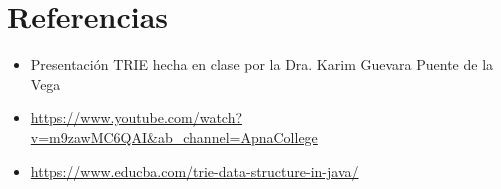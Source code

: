 \documentclass{article}
\begin{document}
\section{Referencias}
\begin{itemize}			
	\item Presentación TRIE hecha en clase por la Dra. Karim Guevara Puente de la Vega
	\item \url{https://www.youtube.com/watch?v=m9zawMC6QAI&ab_channel=ApnaCollege}
	\item \url{https://www.educba.com/trie-data-structure-in-java/}
\end{itemize}	
	
%
%
%
			
\end{document}
